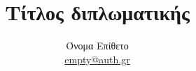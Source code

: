 \documentclass[12pt, a4paper]{report}
\begin{document}


\title{Τίτλος διπλωματικής}
\author{Όνομα Επίθετο \\
\href{mailto:empty@auth.gr}{empty@auth.gr}}
\maketitle

{
\renewcommand*\contentsname{Περιεχόμενα}
\hypersetup{linkcolor=black}
\tableofcontents
}

\thispagestyle{empty}



\appendix





\end{document}
